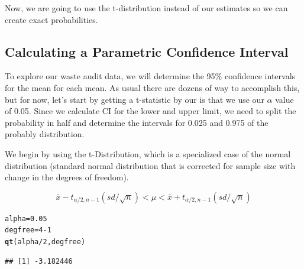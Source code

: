 \documentclass{tufte-handout}\usepackage[]{graphicx}\usepackage[]{color}
\makeatletter
\newcommand{\hlnum}[1]{\textcolor[rgb]{0.686,0.059,0.569}{#1}}%
\newcommand{\hlopt}[1]{\textcolor[rgb]{0,0,0}{#1}}%
\newcommand{\hlstd}[1]{\textcolor[rgb]{0.345,0.345,0.345}{#1}}%
\newcommand{\hlkwb}[1]{\textcolor[rgb]{0.69,0.353,0.396}{#1}}%
\newcommand{\hlkwd}[1]{\textcolor[rgb]{0.737,0.353,0.396}{\textbf{#1}}}%
\newenvironment{kframe}{%
 \def\at@end@of@kframe{}%
 \ifinner\ifhmode%
  \def\at@end@of@kframe{\end{minipage}}%
  \begin{minipage}{\columnwidth}%
 \fi\fi%
 \def\FrameCommand##1{\hskip\@totalleftmargin \hskip-\fboxsep
 \colorbox{shadecolor}{##1}\hskip-\fboxsep
     \hskip-\linewidth \hskip-\@totalleftmargin \hskip\columnwidth}%
 \MakeFramed {\advance\hsize-\width
   \@totalleftmargin\z@ \linewidth\hsize
   \@setminipage}}%
 {\par\unskip\endMakeFramed%
 \at@end@of@kframe}
\newenvironment{knitrout}{}{} %
\makeatother
\begin{document}
Now, we are going to use the t-distribution instead of our estimates so we can create exact probabilities. 

\subsection{Calculating a Parametric Confidence Interval}

To explore our waste audit data, we will determine the 95\% confidence intervals for the mean for each mean. As usual there are dozens of way to accomplish this, but for now, let's start by getting a t-statistic by our is that we use our $\alpha$ value of 0.05. Since we calculate CI for the lower and upper limit, we need to split the probability in half and determine the intervals for 0.025 and 0.975 of the probably distribution.  

We begin by using the t-Distribution, which is a specialized case of the normal distribution (standard normal distribution that is corrected for sample size with change in the degrees of freedom). 

\begin{equation}
\bar{x} - t_{\alpha/2, n-1}(sd/\sqrt{n}) < \mu < \bar{x} + t_{\alpha/2, n-1}(sd/\sqrt{n}) 
\end{equation}

\begin{knitrout}
\color{fgcolor}\begin{kframe}
\begin{alltt}
\hlstd{alpha} \hlkwb{=} \hlnum{0.05}
\hlstd{degfree} \hlkwb{=} \hlnum{4} \hlopt{-} \hlnum{1}
\hlkwd{qt}\hlstd{(alpha}\hlopt{/}\hlnum{2}\hlstd{, degfree)}
\end{alltt}
\begin{verbatim}
## [1] -3.182446
\end{verbatim}
\end{kframe}
\end{knitrout}
\end{document}
